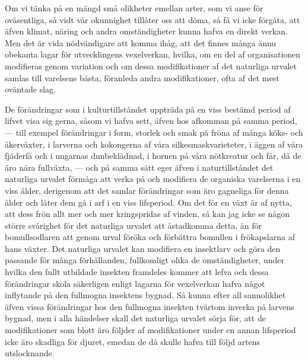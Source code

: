 Om vi tänka på en mängd små olikheter emellan arter, som vi anse för oväsentliga, så vidt vår okunnighet tillåter oss att döma, så få vi icke förgäta, att äfven klimat, näring och andra omständigheter kunna hafva en direkt verkan. Men det är vida nödvändigare att komma ihåg, att det finnes många ännu obekanta lagar för utvecklingens vexelverkan, hvilka, om en del af organisationen modifieras genom variation och om dessa modifikationer af det naturliga urvalet samlas till varelsens bästa, föranleda andra modifikationer, ofta af det mest oväntade slag.

De förändringar som i kulturtillståndet uppträda på en viss bestämd period af lifvet visa sig gerna, såsom vi hafva sett, äfven hos afkomman på samma period, — till exempel förändringar i form, storlek och smak på fröna af många köks- och åkerväxter, i larverna och kokongerna af våra silkesmaskvarieteter, i äggen af våra fjäderfä och i ungarnas dunbeklädnad, i hornen på våra nötkreatur och får, då de äro nära fullväxta, — och på samma sätt eger äfven i naturtillståndet det naturliga urvalet förmåga att verka på och modifiera de organiska varelserna i en viss ålder, derigenom att det samlar förändringar som äro gagneliga för denna ålder och låter dem gå i arf i en viss lifsperiod. Om det för en växt är af nytta, att dess frön allt mer och mer kringspridas af vinden, så kan jag icke se någon större svårighet för det naturliga urvalet att åstadkomma detta, än för bomullsodlaren att genom urval föröka och förbättra bomullen i frökapslarna af hans växter. Det naturliga urvalet kan modifiera en insektlarv och göra den passande för många förhållanden, fullkomligt olika de omständigheter, under hvilka den fullt utbildade insekten framdeles kommer att lefva och dessa förändringar skola säkerligen enligt lagarna för vexelverkan hafva något inflytande på den fullmogna insektens bygnad. Så kunna efter all sannolikhet äfven vissa förändringar hos den fullmogna insekten tvärtom inverka på larvens bygnad, men i alla händelser skall det naturliga urvalet sörja för, att de modifikationer som blott äro följder af modifikationer under en annan lifsperiod icke äro skadliga för djuret, emedan de då skulle hafva till följd artens utslocknande.


